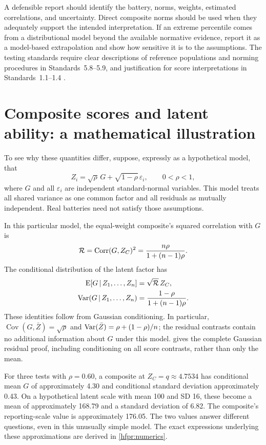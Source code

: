 A defensible report should identify the battery, norms, weights, estimated
correlations, and uncertainty. Direct composite norms should be used when
they adequately support the intended interpretation. If an extreme
percentile comes from a distributional model beyond the available normative
evidence, report it as a model-based extrapolation and show how sensitive
it is to the assumptions. The testing standards require clear descriptions
of reference populations and norming procedures in Standards~5.8--5.9,
and justification for score interpretations in Standards~1.1--1.4
\citep{standards2014}.

\appendix
\chapter{Composite scores and latent ability: a mathematical illustration}
\label{sec:latent}

To see why these quantities differ, suppose, expressly as a hypothetical
model, that
\begin{equation}
  Z_i=\sqrt{\rho}\,G+\sqrt{1-\rho}\,\varepsilon_i,
  \qquad 0<\rho<1,
  \label{eq:factor-model}
\end{equation}
where \(G\) and all \(\varepsilon_i\) are independent standard-normal
variables. This model treats all shared variance as one common factor and
all residuals as mutually independent. Real batteries need not satisfy
those assumptions.

In this particular model, the equal-weight composite's squared correlation
with \(G\) is
\begin{equation}
  \mathcal R=\operatorname{Corr}(G,Z_C)^2=\frac{n\rho}{1+(n-1)\rho}.
  \label{eq:factor-reliability}
\end{equation}
The conditional distribution of the latent factor has
\begin{align}
  \operatorname{E}[G\,\vert\, Z_1,\ldots,Z_n]&=\sqrt{\mathcal R}\,Z_C,
  \label{eq:latent-mean}\\
  \operatorname{Var}(G\,\vert\, Z_1,\ldots,Z_n)&=\frac{1-\rho}{1+(n-1)\rho}.
  \label{eq:latent-variance}
\end{align}
These identities follow from Gaussian conditioning. In particular,
\(\operatorname{Cov}(G,\bar Z)=\sqrt{\rho}\) and
\(\operatorname{Var}(\bar Z)=\rho+(1-\rho)/n\); the residual contrasts contain no
additional information about \(G\) under this model.
 gives the complete Gaussian residual proof, including
conditioning on all score contrasts, rather than only the mean.

For three tests with \(\rho=0.60\), a composite at \(Z_C=q\approx4.7534\) has
conditional mean \(G\) of approximately 4.30 and conditional standard
deviation approximately 0.43. On a hypothetical latent scale with mean 100
and SD 16, these become a mean of approximately 168.79 and a standard
deviation of 6.82. The composite's reporting-scale value is approximately
176.05. The two values answer different questions, even in this unusually
simple model.
The exact expressions underlying these approximations are derived in
\cref{hfpr:numerics}.

